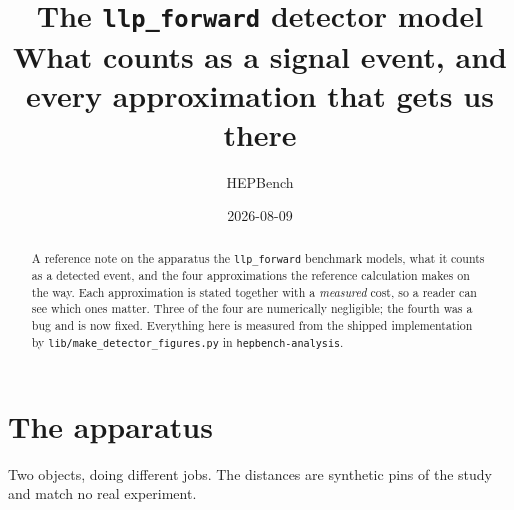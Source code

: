 \documentclass[11pt]{article}
\title{The \texttt{llp\_forward} detector model\\
\large What counts as a signal event, and every approximation that gets us there}
\author{HEPBench}
\date{2026-08-09}
\begin{document}
\maketitle

\begin{abstract}
\noindent
A reference note on the apparatus the \texttt{llp\_forward} benchmark models,
what it counts as a detected event, and the four approximations the reference
calculation makes on the way. Each approximation is stated together with a
\emph{measured} cost, so a reader can see which ones matter. Three of the four
are numerically negligible; the fourth was a bug and is now fixed. Everything
here is measured from the shipped implementation by
\texttt{lib/make\_detector\_figures.py} in \texttt{hepbench-analysis}.
\end{abstract}

\section{The apparatus}

Two objects, doing different jobs. The distances are synthetic pins of the
study and match no real experiment.
\end{document}
